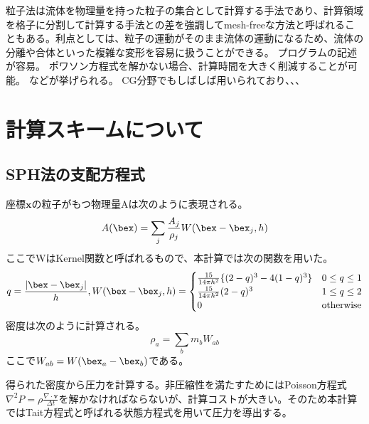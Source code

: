 \documentclass[]{jsarticle}
\begin{document}
粒子法は流体を物理量を持った粒子の集合として計算する手法であり、計算領域を格子に分割して計算する手法との差を強調してmesh-freeな方法と呼ばれることもある。利点としては、粒子の運動がそのまま流体の運動になるため、流体の分離や合体といった複雑な変形を容易に扱うことができる。
プログラムの記述が容易。
ポワソン方程式を解かない場合、計算時間を大きく削減することが可能。
などが挙げられる。
CG分野でもしばしば用いられており、、、

\label{subsec:label}

\section{計算スキームについて}
\subsection{SPH法の支配方程式}
座標$\bm{x}$の粒子がもつ物理量Aは次のように表現される。 \cite{Becker2007}
\begin{equation}
A(\bex)=\sum_j \frac{A_j}{\rho_j} W(\bex-\bex_j,h)
\end{equation}
ここでWはKernel関数と呼ばれるもので、本計算では次の関数を用いた。
\begin{equation}
  q=\frac{|\bex-\bex_j|}{h}, 
  W(\bex-\bex_j,h)=\begin{cases}
    \frac{15}{14\pi h^2} \{(2-q)^3-4(1-q)^3\} & \text{$ 0 \leq q \leq 1$}\\
    \frac{15}{14\pi h^2} (2-q)^3 & \text{$1\leq q \leq 2$}\\
    0 & \text{otherwise}
\end{cases}
\end{equation}
密度は次のように計算される。
\begin{equation}
\rho_{a}=\sum_bm_bW_{ab}
\end{equation}
ここで$W_{ab}=W(\bex_a-\bex_b)$である。

得られた密度から圧力を計算する。非圧縮性を満たすためにはPoisson方程式$\nabla^2P=\rho\frac{\nabla\cdot\bm{v}}{\Delta t}$を解かなければならないが、計算コストが大きい。そのため本計算ではTait方程式と呼ばれる状態方程式を用いて圧力を導出する。
\end{document}
